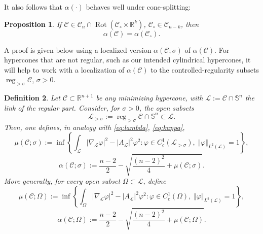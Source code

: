 \documentclass[11pt, letterpaper, reqno]{amsart}
\numberwithin{equation}{section}
\newtheorem{Def}{Definition}[section]
\newtheorem{Prop}[Def]{Proposition}
\theoremstyle{remark}
\newcommand{\RR}{\mathbb{R}}
\newcommand{\SSp}{\mathbb{S}}
\newcommand{\cC}{\mathcal{C}}
\newcommand{\cL}{\mathcal{L}}
\newcommand{\reg}{\operatorname{reg}}
\newcommand{\Rot}{\operatorname{Rot}}
\begin{document}
It also follows that $\alpha(\cdot)$ behaves well under cone-splitting:

\begin{Prop} \label{prop:kappa.spine}
	If $\cC \in \mathscr{C}_n \cap \Rot(\cC_\circ \times \RR^k)$, $\cC_\circ \in \mathscr{C}_{n-k}$, then
	\[ \alpha(\cC) = \alpha(\cC_\circ). \]
\end{Prop}

A proof is given below using a localized version $\alpha(\cC; \sigma)$ of $\alpha(\cC)$. For hypercones that are not regular, such as our intended cylindrical hypercones, it will help to work with a localization of $\alpha(\cC)$ to the controlled-regularity subsets $\reg_{>\sigma} \cC$, $\sigma > 0$.

\begin{Def} \label{defi:kappa.lambda.sigma}
Let $\cC \subset \RR^{n+1}$ be any minimizing hypercone, with $\cL := \cC \cap \SSp^n$ the link of the regular part. Consider, for $\sigma > 0$, the open subsets
\[ \cL_{>\sigma} := \reg_{>\sigma} \cC  \cap \SSp^n \subset \cL. \]
Then, one defines, in analogy with \eqref{eq:lambda}, \eqref{eq:kappa},
\begin{equation} \label{eq:lambda.rho}
	\mu(\cC; \sigma) := \inf \left\{ \int_\cL |\nabla_\cL \varphi|^2 - |A_\cL|^2 \varphi^2 : \varphi \in C^1_c(\cL_{>\sigma}), \; \Vert \varphi \Vert_{L^2(\cL)} = 1 \right\},
\end{equation}
\begin{equation} \label{eq:kappa.rho}
	\alpha(\cC; \sigma) := \frac{n-2}{2} - \sqrt{\frac{(n-2)^2}{4} + \mu(\cC; \sigma)}.
\end{equation}
  More generally, for every open subset $\Omega \subset \cL$, define 
  \begin{equation} \label{equ_mu(Omega)}
	\mu(\cC; \Omega) := \inf \left\{ \int_\Omega |\nabla_\cL \varphi|^2 - |A_\cL|^2 \varphi^2 : \varphi \in C^1_c(\Omega), \; \Vert \varphi \Vert_{L^2(\cL)} = 1 \right\},
  \end{equation}
  \begin{equation} \label{equ_alpha(Omega)}
	\alpha(\cC; \Omega) := \frac{n-2}{2} - \sqrt{\frac{(n-2)^2}{4} + \mu(\cC; \Omega)}.
  \end{equation}
\end{Def}
\end{document}

